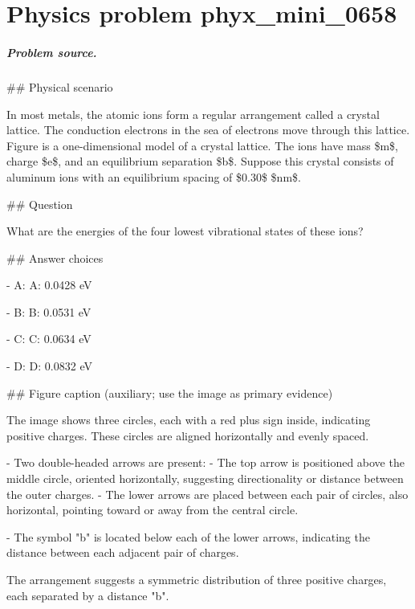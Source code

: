 
\chapter{Physics problem phyx\_mini\_0658}
\label{ch:PhyXMiniProblems_problem_phyx_mini_0658}

\paragraph{Problem source.}
\#\# Physical scenario

In most metals, the atomic ions form a regular arrangement called a crystal lattice. The conduction electrons in the sea of electrons move through this lattice. Figure is a one-dimensional model of a crystal lattice. The ions have mass \$m\$, charge \$e\$, and an equilibrium separation \$b\$. Suppose this crystal consists of aluminum ions with an equilibrium spacing of \$0.30\$ \$nm\$.

\#\# Question

What are the energies of the four lowest vibrational states of these ions?

\#\# Answer choices

- A: A: 0.0428 eV

- B: B: 0.0531 eV

- C: C: 0.0634 eV

- D: D: 0.0832 eV

\#\# Figure caption (auxiliary; use the image as primary evidence)

The image shows three circles, each with a red plus sign inside, indicating positive charges. These circles are aligned horizontally and evenly spaced.

- Two double-headed arrows are present:
  - The top arrow is positioned above the middle circle, oriented horizontally, suggesting directionality or distance between the outer charges.
  - The lower arrows are placed between each pair of circles, also horizontal, pointing toward or away from the central circle.

- The symbol "b" is located below each of the lower arrows, indicating the distance between each adjacent pair of charges.

The arrangement suggests a symmetric distribution of three positive charges, each separated by a distance "b".

